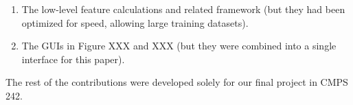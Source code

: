 \documentclass[11pt,letter]{article}
\begin{document}
\begin{enumerate}
\item The low-level feature calculations and related framework (but they had been optimized for speed, allowing large training datasets).
\item The GUIs in Figure XXX and XXX (but they were combined into a single interface for this paper).
\end{enumerate}

The rest of the contributions were developed solely for our final project in CMPS 242.



\end{document}
